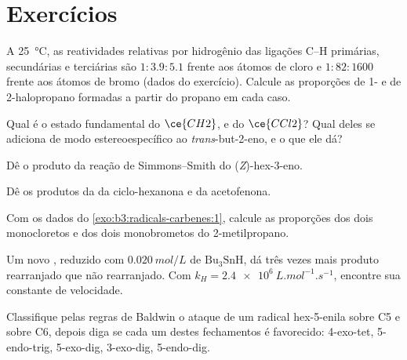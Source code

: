 \section{Exercícios}

\begin{exercise}[$\star$]\label{exo:b3:radicals-carbenes:1}
A \qty{25}{\celsius}, as reatividades relativas por hidrogênio das ligações C--H primárias, secundárias e
terciárias são $1 : 3.9 : 5.1$ frente aos átomos de cloro e $1 : 82 : 1600$ frente aos
átomos de bromo (dados do exercício). Calcule as proporções de 1- e de 2-halopropano
formadas a partir do propano em cada caso.
\end{exercise}

\begin{exercise}[$\star$]\label{exo:b3:radicals-carbenes:2}
Qual é o estado fundamental do $\ce{CH2}$, e do $\ce{CCl2}$? Qual deles se adiciona de modo estereoespecífico ao
\textit{trans}-but-2-eno, e o que ele dá?
\end{exercise}

\begin{exercise}[$\star$]\label{exo:b3:radicals-carbenes:3}
Dê o produto da reação de Simmons--Smith do (\textit{Z})-hex-3-eno.
\end{exercise}

\begin{exercise}[$\star$]\label{exo:b3:radicals-carbenes:4}
Dê os produtos da  da ciclo-hexanona e da
acetofenona.
\end{exercise}

\begin{exercise}[$\star\star$]\label{exo:b3:radicals-carbenes:5}
Com os dados do \cref{exo:b3:radicals-carbenes:1}, calcule as proporções dos
dois monocloretos e dos dois monobrometos do 2-metilpropano.
\end{exercise}

\begin{exercise}[$\star\star$]\label{exo:b3:radicals-carbenes:6}
Um novo , reduzido com $\qty{0.020}{mol/L}$ de $\mathrm{Bu_3SnH}$, dá três vezes mais produto rearranjado
que não rearranjado. Com $k_H = \qty{2.4e6}{L.mol^{-1}.s^{-1}}$, encontre sua constante de velocidade.
\end{exercise}

\begin{exercise}[$\star\star$]\label{exo:b3:radicals-carbenes:7}
Classifique pelas regras de Baldwin o ataque de um radical hex-5-enila sobre C5 e sobre C6,
depois diga se cada um destes fechamentos é favorecido: 4-exo-tet, 5-endo-trig,
5-exo-dig, 3-exo-dig, 5-endo-dig.
\end{exercise}

